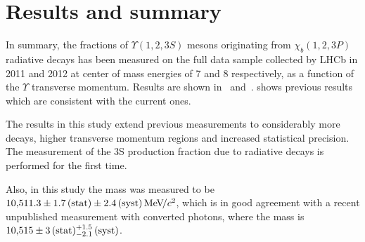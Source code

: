 \section{Results and summary}
\label{sec:results}

In summary, the fractions of $\Upsilon(1,2,3S)$ mesons originating from $\chi_b(1,2,3P)$ 
radiative decays has been measured on the full data sample collected by LHCb in 2011 and 2012 
at center of mass energies of 7 and 8 \tev respectively, as a function of the $\Upsilon$ 
transverse momentum. Results are shown in~
and~.
 shows previous \lhcb results which
are consistent with the current ones.







The results in this study extend previous \lhcb measurements to considerably
more decays, higher transverse momentum regions and increased statistical
precision. The measurement of the 
\Y3S production fraction due to radiative \chibThreeP decays is performed for the first time.

Also, in this study the \chiboneThreeP mass was measured to be $10{,}511.3 \pm
1.7\mathrm{\,(stat)} \pm 2.4 \mathrm{\,(syst)} {\mathrm{\,Me\kern -0.1em V\!/}c^2}$, which is in good agreement with a recent
unpublished \lhcb measurement with converted photons, where the \chiboneThreeP mass is
$10{,}515 \pm 3\mathrm{\,(stat)}{}^{+1.5}_{-2.1}\mathrm{\,(syst)}$.
